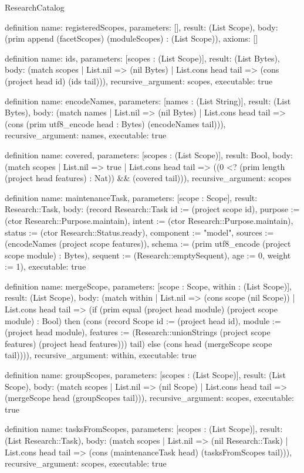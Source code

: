 \begin{lexlean}{ResearchCatalog}
\begin{semanticmodule}
definition{
  name: registeredScopes,
  parameters: [],
  result: (List Scope),
  body: (prim append (facetScopes) (moduleScopes) : (List Scope)),
  axioms: []
}

definition{
  name: ids,
  parameters: [scopes : (List Scope)],
  result: (List Bytes),
  body: (match scopes
    | List.nil => (nil Bytes)
    | List.cons head tail => (cons (project head id) (ids tail))),
  recursive_argument: scopes,
  executable: true
}

definition{
  name: encodeNames,
  parameters: [names : (List String)],
  result: (List Bytes),
  body: (match names
    | List.nil => (nil Bytes)
    | List.cons head tail => (cons (prim utf8_encode head : Bytes) (encodeNames tail))),
  recursive_argument: names,
  executable: true
}

definition{
  name: covered,
  parameters: [scopes : (List Scope)],
  result: Bool,
  body: (match scopes
    | List.nil => true
    | List.cons head tail => ((0 <? (prim length (project head features) : Nat)) && (covered tail))),
  recursive_argument: scopes
}

definition{
  name: maintenanceTask,
  parameters: [scope : Scope],
  result: Research::Task,
  body: (record Research::Task {id := (project scope id), purpose := (ctor Research::Purpose.maintain), intent := (ctor Research::Purpose.maintain), status := (ctor Research::Status.ready), component := "model", sources := (encodeNames (project scope features)), schema := (prim utf8_encode (project scope module) : Bytes), sequent := (Research::emptySequent), age := 0, weight := 1}),
  executable: true
}

definition{
  name: mergeScope,
  parameters: [scope : Scope, within : (List Scope)],
  result: (List Scope),
  body: (match within
    | List.nil => (cons scope (nil Scope))
    | List.cons head tail => (if (prim equal (project head module) (project scope module) : Bool) then (cons (record Scope {id := (project head id), module := (project head module), features := (Research::unionStrings (project scope features) (project head features))}) tail) else (cons head (mergeScope scope tail)))),
  recursive_argument: within,
  executable: true
}

definition{
  name: groupScopes,
  parameters: [scopes : (List Scope)],
  result: (List Scope),
  body: (match scopes
    | List.nil => (nil Scope)
    | List.cons head tail => (mergeScope head (groupScopes tail))),
  recursive_argument: scopes,
  executable: true
}

definition{
  name: tasksFromScopes,
  parameters: [scopes : (List Scope)],
  result: (List Research::Task),
  body: (match scopes
    | List.nil => (nil Research::Task)
    | List.cons head tail => (cons (maintenanceTask head) (tasksFromScopes tail))),
  recursive_argument: scopes,
  executable: true
}


\end{semanticmodule}
\end{lexlean}
